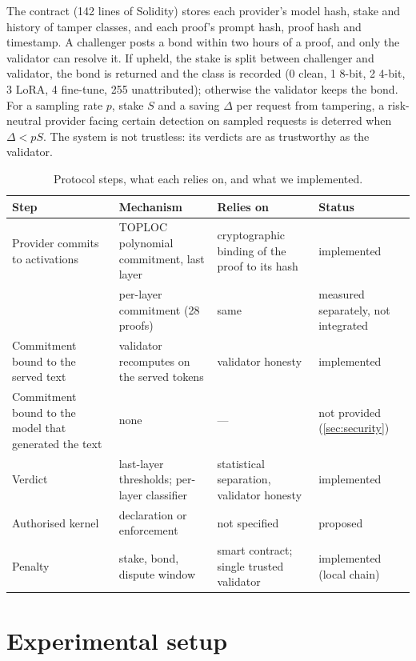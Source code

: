 \documentclass[11pt]{article}
\begin{document}
The contract (142 lines of Solidity) stores each provider's model hash, stake and history of tamper classes, and each proof's prompt hash, proof hash and timestamp.
A challenger posts a bond within two hours of a proof, and only the validator can resolve it.
If upheld, the stake is split between challenger and validator, the bond is returned and the class is recorded (0 clean, 1 8-bit, 2 4-bit, 3 LoRA, 4 fine-tune, 255 unattributed); otherwise the validator keeps the bond.
For a sampling rate $p$, stake $S$ and a saving $\Delta$ per request from tampering, a risk-neutral provider facing certain detection on sampled requests is deterred when $\Delta < pS$.
The system is not trustless: its verdicts are as trustworthy as the validator.

\begin{table}[!htb]
\centering
\small
\caption{Protocol steps, what each relies on, and what we implemented.}
\label{tab:protocol}
\begin{tabular}{@{}>{\raggedright\arraybackslash}p{}>{\raggedright\arraybackslash}p{}>{\raggedright\arraybackslash}p{}>{\raggedright\arraybackslash}p{}@{}}
\toprule
Step & Mechanism & Relies on & Status \\
\midrule
Provider commits to activations & TOPLOC polynomial commitment, last layer & cryptographic binding of the proof to its hash & implemented \\
 & per-layer commitment (28 proofs) & same & measured separately, not integrated \\
Commitment bound to the served text & validator recomputes on the served tokens & validator honesty & implemented \\
Commitment bound to the model that generated the text & none & --- & not provided (\cref{sec:security}) \\
Verdict & last-layer thresholds; per-layer classifier & statistical separation, validator honesty & implemented \\
Authorised kernel & declaration or enforcement & not specified & proposed \\
Penalty & stake, bond, dispute window & smart contract; single trusted validator & implemented (local chain) \\
\bottomrule
\end{tabular}
\end{table}

\section{Experimental setup}
\label{sec:setup}
\end{document}
